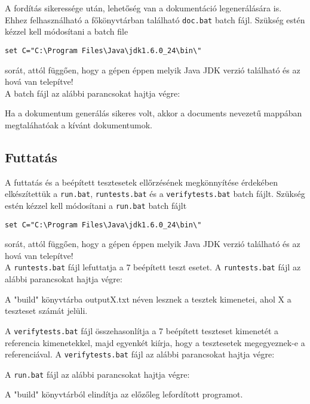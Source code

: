 A fordítás sikeressége után, lehetőség van a dokumentáció legenerálására is. Ehhez felhasználható a főkönyvtárban található \texttt{doc.bat} batch fájl.
Szükség estén kézzel kell módosítani a batch file \begin{verbatim}
set C="C:\Program Files\Java\jdk1.6.0_24\bin\" 
\end{verbatim}
sorát, attól függően, hogy a gépen éppen melyik Java JDK verzió található és az hová van telepítve!\\

A batch fájl az alábbi parancsokat hajtja végre:

Ha a dokumentum generálás sikeres volt, akkor a documents nevezetű mappában megtaláhatóak a kívánt dokumentumok.



\subsection{Futtatás}
A futtatás és a beépített tesztesetek ellőrzésének megkönnyítése érdekében elkészítettük a \texttt{run.bat}, \texttt{runtests.bat} és a \texttt{verifytests.bat} batch fájlt.
Szükség estén kézzel kell módosítani a \texttt{run.bat} batch fájlt 
\begin{verbatim}
set C="C:\Program Files\Java\jdk1.6.0_24\bin\" 
\end{verbatim} sorát, attól függően, hogy a gépen éppen melyik Java JDK verzió található és az hová van telepítve!\\

A \texttt{runtests.bat} fájl lefuttatja a 7 beépített teszt esetet.
A \texttt{runtests.bat} fájl az alábbi parancsokat hajtja végre:

A "build" könyvtárba outputX.txt néven lesznek a tesztek kimenetei, ahol X a teszteset számát jelüli.

A \texttt{verifytests.bat} fájl összehasonlítja a 7 beépített teszteset kimenetét a referencia kimenetekkel, majd egyenkét kiírja, hogy a tesztesetek megegyeznek-e a referenciával.
A \texttt{verifytests.bat} fájl az alábbi parancsokat hajtja végre:



A \texttt{run.bat} fájl az alábbi parancsokat hajtja végre:

A "build" könyvtárból elindítja az előzőleg lefordított programot.










